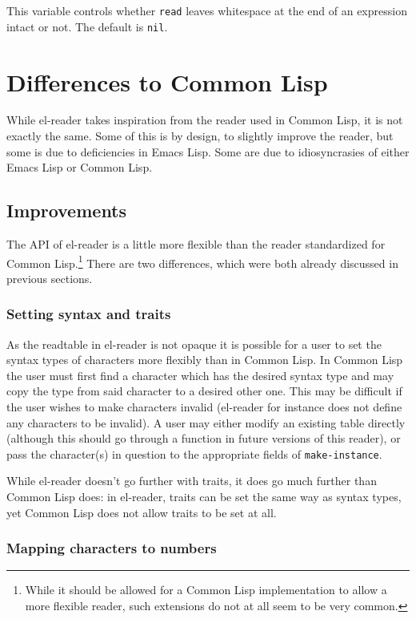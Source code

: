 \documentclass[a4paper,10pt,twoside]{report}
\newcommand{\el}{Emacs Lisp}
\newcommand{\cl}{Common Lisp}
\newcommand{\elr}{el-reader}
\newcommand{\sym}[1]{\texttt{#1}}
\newcommand{\fun}[1]{\texttt{#1}}
\newcommand{\Read}{\fun{read}}
\newcommand{\nil}{\sym{nil}}
\begin{document}
This variable controls whether \Read{} leaves whitespace at the end of an
expression intact or not.  The default is \nil{}.

\section{Differences to \cl{}}
\label{sec:cl-differences}

While \elr{} takes inspiration from the reader used in \cl{}, it is not exactly
the same.  Some of this is by design, to slightly improve the reader, but some
is due to deficiencies in \el{}.  Some are due to idiosyncrasies of either \el{}
or \cl{}.

\subsection{Improvements}
\label{subsec:improvements}

The API of \elr{} is a little more flexible than the reader standardized for
\cl{}.\footnote{While it should be allowed for a \cl{} implementation to allow a
more flexible reader, such extensions do not at all seem to be very common.}
There are two differences, which were both already discussed in previous
sections.

\subsubsection{Setting syntax and traits}
\label{subsubsec:set-syntax-traits}

As the readtable in \elr{} is not opaque it is possible for a user to set the
syntax types of characters more flexibly than in \cl{}.  In \cl{} the user must
first find a character which has the desired syntax type and may copy the type
from said character to a desired other one.  This may be difficult if the user
wishes to make characters invalid (\elr{} for instance does not define any
characters to be invalid).  A user may either modify an existing table directly
(although this should go through a function in future versions of this reader),
or pass the character(s) in question to the appropriate fields of
\fun{make-instance}.

While \elr{} doesn’t go further with traits, it does go much further than \cl{}
does: in \elr{}, traits can be set the same way as syntax types, yet \cl{} does
not allow traits to be set at all.

\subsubsection{Mapping characters to numbers}
\label{subsubsec:chars-to-nums}
\end{document}
